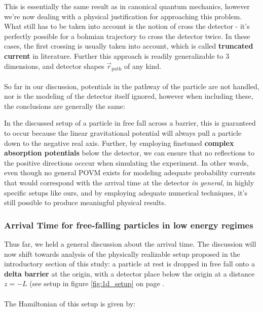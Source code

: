This is essentially the same result as in canonical quantum mechanics, however we're now dealing with a physical justification for approaching this problem. What still has to be taken into account is the notion of cross the detector - it's perfectly possible for a bohmian trajectory to cross the detector twice. In these cases, the first crossing is usually taken into account, which is called \textbf{truncated current} in literature. Further this approach is readily generalizable to 3 dimensions, and detector shapes $\vec{r}_{\text{path}}$ of any kind.
\\\\
So far in our discussion, potentials in the pathway of the particle are not handled, nor is the modeling of the detector itself ignored, however when including these, the conclusions are generally the same:


In the discussed setup of a particle in free fall across a barrier, this is guaranteed to occur because the linear gravitational potential will always pull a particle down to the negative real axis. Further, by employing finetuned \textbf{complex absorption potentials} below the detector, we can ensure that no reflections to the positive directions occcur when simulating the experiment. In other words, even though no general POVM exists for modeling adequate probability currents that would correspond with the arrival time at the detector \textit{in general}, in highly specific setups like ours, and by employing adequate numerical techniques, it's still possible to produce meaningful physical results.

\subsubsection{Arrival Time for free-falling particles in low energy regimes}

Thus far, we held a general discussion about the arrival time. The discussion will now shift towards analysis of the physically realizable setup proposed in the introductory section of this study: a particle at rest is dropped in free fall onto a \textbf{delta barrier} at the origin, with a detector place below the origin at a distance $z=-L$ (see setup in figure \ref{fig:1d_setup} on page \pageref{fig:1d_setup}.
\\\\
The Hamiltonian of this setup is given by:

